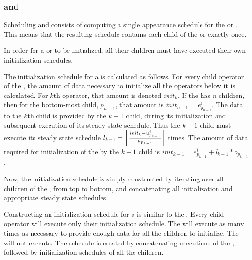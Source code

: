 \subsubsection{{\pipelines} and {\splitjoins}}

Scheduling {\pipelines} and {\splitjoin} consists of computing a
single appearance schedule for the {\pipeline} or {\splitjoin}.
This means that the resulting schedule contains each child of the
{\pipeline} or {\splitjoin} exactly once.

 In order for a
{\pipeline} or {\splitjoin} to be initialized, all their children
must have executed their own initialization schedules.

The initialization schedule for a {\pipeline} is calculated as
follows. For every child operator of the {\pipeline}, the amount
of data necessary to initialize all the operators below it is
calculated. For $k$th operator, that amount is denoted $init_k$.
If the {\pipeline} has $n$ children, then for the bottom-most
child, $p_{n-1}$, that amount is $init_{n-1} = e^i_{p_{n-1}}$. The
data to the $k$th child is provided by the $k-1$ child, during its
initialization and subsequent execution of its steady state
schedule. Thus the $k-1$ child must execute its steady state
schedule $l_{k-1} = \left\lceil init_k - u^i_{p_{k-1}} \over
u_{p_{k-1}} \right\rceil$ times.  The amount of data required for
initialization of the {\pipeline} by the $k-1$ child is
$init_{k-1} = e^i_{p_{k-1}} + l_{k-1} * o_{p_{k-1}}$.

Now, the initialization schedule is simply constructed by
iterating over all children of the {\pipeline}, from top to
bottom, and concatenating all initialization and appropriate
steady state schedules.

Constructing an initialization schedule for a {\splitjoin} is
similar to the {\pipeline}. Every child operator will execute only
their initialization schedule. The {\splitter} will execute as
many times as necessary to provide enough data for all the
children to initialize. The {\joiner} will not execute. The
schedule is created by concatenating executions of the
{\splitter}, followed by initialization schedules of all the
children.

